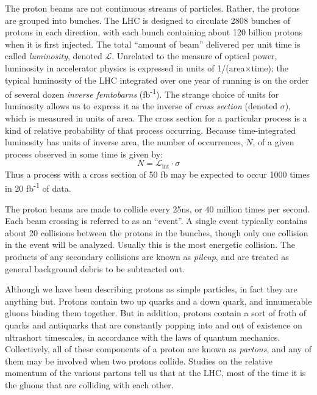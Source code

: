 The proton beams are not continuous streams of particles. Rather, the
protons are grouped into bunches. The LHC is designed to circulate
2808 bunches of protons in each direction, with each bunch containing
about 120 billion protons when it is first injected.
The total ``amount of beam'' delivered per unit time is called
\emph{luminosity}, denoted $\mathcal{L}$. Unrelated to the measure of
optical power, luminosity in accelerator physics is expressed in
units of 1/(area$\times$time); the typical luminosity of the LHC integrated over one
year of running is on the order of several dozen
\emph{inverse femtobarns} (fb\textsuperscript{-1}). The strange
choice of units for luminosity allows us to express it as the inverse of
\emph{cross section} (denoted $\sigma$), which is measured in units
of area. The cross section for a particular process is a kind of
relative probability of that process occurring. Because time-integrated
luminosity has units of inverse area, the number of occurrences, $N$,
of a given process observed in some time is given by:
\begin{equation}
N = \mathcal{L}_\text{int} \cdot \sigma
\end{equation}
Thus a process with a cross section of 50 fb may be expected
to occur 1000 times in 20 fb\textsuperscript{-1} of data.

The proton beams are made to collide every 25ns, or 40 million times
per second. Each beam crossing is referred to as an ``event''. A
single event typically contains about 20 collisions between the
protons in the bunches, though only one collision in the event will be
analyzed. Usually this is the most energetic collision. The products
of any secondary collisions are known as \emph{pileup}, and are
treated as general background debris to be subtracted out.

Although we have been describing protons as simple particles, in fact
they are anything but. Protons contain two up quarks and a down quark,
and innumerable gluons binding them together. But in addition, protons
contain a sort of froth of quarks and antiquarks that are constantly
popping into and out of existence on ultrashort timescales, in
accordance with the laws of quantum mechanics. Collectively, all of
these components of a proton are known as \emph{partons}, and any of
them may be involved when two protons collide. Studies on the relative
momentum of the various partons tell us that at the LHC, most of the
time it is the gluons that are colliding with each other. %

